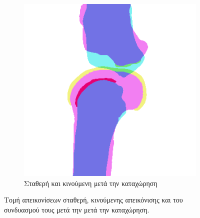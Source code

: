 \documentclass[a4paper,12pt]{article}
\begin{document}
\begin{figure}[H]
    \begin{subfigure}[t]{0.4\linewidth}
    \includegraphics[width=\linewidth]{combination_label_before_registration_1.png}
    \caption{Σταθερή και κινούμενη μετά την καταχώρηση}
    \end{subfigure}

    \caption{Τομή απεικονίσεων σταθερή, κινούμενης απεικόνισης και του
             συνδυασμού τους μετά την μετά την καταχώρηση.}
    \label{fig:registration_before:1}
\end{figure}
\end{document}
